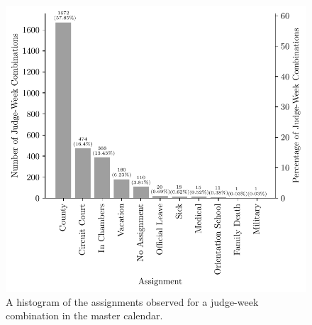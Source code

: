 \documentclass[11pt, oneside]{article}   	%
\theoremstyle{ModifiedStyle}
\begin{document}
			\begin{figure}
				\centering
				\includegraphics[scale=0.65]{Figures/Type_of_Assignment_Histogram}
				\caption{A histogram of the assignments observed for a judge-week combination in the master calendar.}
				\label{Figure_Assignment_Histogram}
			\end{figure}

\end{document}
